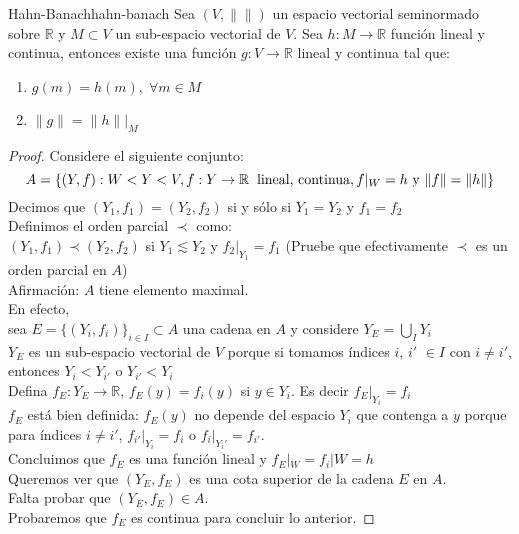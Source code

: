\documentclass[12pt,a4paper]{book}
\providecommand{\norm}[1]{\lVert#1\rVert}
\begin{document}
\smallskip

\begin{teorema}{Hahn-Banach}{hahn-banach}
Sea $(V, \norm{ })$ un espacio vectorial seminormado sobre $\mathbb{R}$ y $M\subset V$ un sub-espacio vectorial de $V$. Sea  $h:M\rightarrow\mathbb{R}$ función lineal y continua, entonces existe una función $g:V\rightarrow \mathbb{R}$ lineal y continua tal que:
\begin{enumerate}
\item $g(m)=h(m),\;\forall m\in M$
\item $\norm{g}=\norm{h}|_{M}$ 
\end{enumerate} 
\end{teorema}

\begin{proof}
Considere el siguiente conjunto:
$$ A = \{(Y, f) :  W < Y<V, f:Y\rightarrow \mathbb{R} \hspace{0.2cm} \text{lineal, continua}, f|_{W} = h \text{ y } \norm{f} = \norm{h}  \} $$
Decimos que $(Y_1, f_1) = (Y_2, f_2)$ si y sólo si $Y_1 = Y_2$ y $f_1 = f_2$ \\
Definimos el orden parcial $\prec$ como: \\
$(Y_1, f_1) \prec (Y_2, f_2)$ si $Y_1 \lesssim Y_2$ y $f_2 |_{Y_1} = f_1$
(Pruebe que efectivamente $\prec$ es un orden parcial en $A$) \\
Afirmación: $A$ tiene elemento maximal.\\
En efecto, \\
sea $E = \{(Y_i , f_i) \}_{i \in I} \subset A$ una cadena en $A$ y considere $Y_E = \bigcup _{I} Y_i$ \\
$Y_E$ es un sub-espacio vectorial de $V$ porque si tomamos índices $i$, $i'$ $\in I$ con $i \neq i'$, entonces $Y_i <  Y_{i'}$ o $Y_{i'} < Y_i$\\
Defina $f_E : Y_E \rightarrow \mathbb{R}$, $f_E(y) = f_i (y)$ si $y \in Y_i$. Es decir $f_{E} |_{Y_i} = f_i$\\
$f_E$ está bien definida: $f_E (y)$ no depende del espacio $Y_i$ que contenga a $y$ porque para índices $i \neq i'$, $f_{i'} |_{Y_i} = f_i$ o $f_{i} |_{Y_i'} = f_{i'}$. \\
Concluimos que $f_E$ es una función lineal y $f_{E} |_W = f_{i} | W = h$ \\
Queremos ver que $(Y_E, f_E)$ es una cota superior de la cadena $E$ en $A$. \\
Falta probar que $(Y_E, f_E) \in A$. \\
Probaremos que $f_E$ es continua para concluir lo anterior.


\end{proof}
\end{document}
